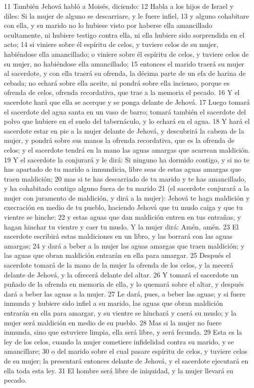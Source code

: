 11 También Jehová habló a Moisés, diciendo:
12 Habla a los hijos de Israel y diles: Si la mujer de alguno se descarriare, y le fuere infiel,
13 y alguno cohabitare con ella, y su marido no lo hubiese visto por haberse ella amancillado ocultamente, ni hubiere testigo contra ella, ni ella hubiere sido sorprendida en el acto;
14 si viniere sobre él espíritu de celos, y tuviere celos de su mujer, habiéndose ella amancillado; o viniere sobre él espíritu de celos, y tuviere celos de su mujer, no habiéndose ella amancillado;
15 entonces el marido traerá su mujer al sacerdote, y con ella traerá su ofrenda, la décima parte de un efa   de harina de cebada; no echará sobre ella aceite, ni pondrá sobre ella incienso, porque es ofrenda de celos, ofrenda recordativa, que trae a la memoria el pecado. 
16 Y el sacerdote hará que ella se acerque y se ponga delante de Jehová.
17 Luego tomará el sacerdote del agua santa en un vaso de barro; tomará también el sacerdote del polvo que hubiere en el suelo del tabernáculo, y lo echará en el agua.
18 Y hará el sacerdote estar en pie a la mujer delante de Jehová, y descubrirá la cabeza de la mujer, y pondrá sobre sus manos la ofrenda recordativa, que es la ofrenda de celos; y el sacerdote tendrá en la mano las aguas amargas que acarrean maldición.
19 Y el sacerdote la conjurará y le dirá: Si ninguno ha dormido contigo, y si no te has apartado de tu marido a inmundicia, libre seas de estas aguas amargas que traen maldición;
20 mas si te has descarriado de tu marido y te has amancillado, y ha cohabitado contigo alguno fuera de tu marido
21 (el sacerdote conjurará a la mujer con juramento de maldición, y dirá a la mujer): Jehová te haga maldición y execración en medio de tu pueblo, haciendo Jehová que tu muslo caiga y que tu vientre se hinche;
22 y estas aguas que dan maldición entren en tus entrañas, y hagan hinchar tu vientre y caer tu muslo. Y la mujer dirá: Amén, amén.
23 El sacerdote escribirá estas maldiciones en un libro, y las borrará con las aguas amargas;
24 y dará a beber a la mujer las aguas amargas que traen maldición; y las aguas que obran maldición entrarán en ella para amargar.
25 Después el sacerdote tomará de la mano de la mujer la ofrenda de los celos, y la mecerá delante de Jehová, y la ofrecerá delante del altar.
26 Y tomará el sacerdote un puñado de la ofrenda en memoria de ella, y lo quemará sobre el altar, y después dará a beber las aguas a la mujer.
27 Le dará, pues, a beber las aguas; y si fuere inmunda y hubiere sido infiel a su marido, las aguas que obran maldición entrarán en ella para amargar, y su vientre se hinchará y caerá su muslo; y la mujer será maldición en medio de su pueblo.
28 Mas si la mujer no fuere inmunda, sino que estuviere limpia, ella será libre, y será fecunda.
29 Esta es la ley de los celos, cuando la mujer cometiere infidelidad contra su marido, y se amancillare;
30 o del marido sobre el cual pasare espíritu de celos, y tuviere celos de su mujer; la presentará entonces delante de Jehová, y el sacerdote ejecutará en ella toda esta ley.
31 El hombre será libre de iniquidad, y la mujer llevará su pecado.

